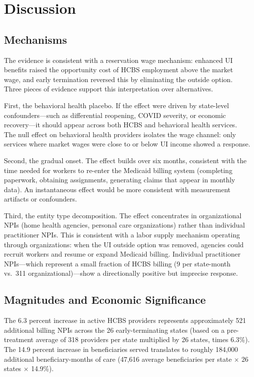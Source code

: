 \documentclass[12pt]{article}
\begin{document}
\section{Discussion}

\subsection{Mechanisms}

The evidence is consistent with a reservation wage mechanism: enhanced UI benefits raised the opportunity cost of HCBS employment above the market wage, and early termination reversed this by eliminating the outside option. Three pieces of evidence support this interpretation over alternatives.

First, the behavioral health placebo. If the effect were driven by state-level confounders---such as differential reopening, COVID severity, or economic recovery---it should appear across both HCBS and behavioral health services. The null effect on behavioral health providers isolates the wage channel: only services where market wages were close to or below UI income showed a response.

Second, the gradual onset. The effect builds over six months, consistent with the time needed for workers to re-enter the Medicaid billing system (completing paperwork, obtaining assignments, generating claims that appear in monthly data). An instantaneous effect would be more consistent with measurement artifacts or confounders.

Third, the entity type decomposition. The effect concentrates in organizational NPIs (home health agencies, personal care organizations) rather than individual practitioner NPIs. This is consistent with a labor supply mechanism operating through organizations: when the UI outside option was removed, agencies could recruit workers and resume or expand Medicaid billing. Individual practitioner NPIs---which represent a small fraction of HCBS billing (9 per state-month vs.\ 311 organizational)---show a directionally positive but imprecise response.

\subsection{Magnitudes and Economic Significance}

The 6.3 percent increase in active HCBS providers represents approximately 521 additional billing NPIs across the 26 early-terminating states (based on a pre-treatment average of 318 providers per state multiplied by 26 states, times 6.3\%). The 14.9 percent increase in beneficiaries served translates to roughly 184,000 additional beneficiary-months of care (47,616 average beneficiaries per state $\times$ 26 states $\times$ 14.9\%).
\end{document}
